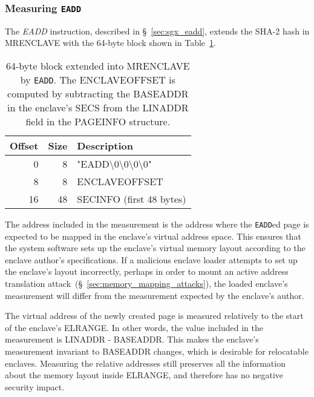\subsubsection{Measuring \texttt{EADD}}
\label{sec:sgx_eadd_mrenclave}


The \textit{EADD} instruction, described in \S~\ref{sec:sgx_eadd}, extends the
SHA-2 hash in MRENCLAVE with the 64-byte block shown in
Table~\ref{fig:eadd_mrenclave}.

\begin{table}[hbt]
  \centering
  \begin{tabularx}{\columnwidth}{| r | r | X |}
  \hline
  \textbf{Offset} & \textbf{Size} & \textbf{Description}\\
  \hline
  0 & 8 &
  "EADD\textbackslash{}0\textbackslash{}0\textbackslash{}0\textbackslash{}0" \\
  \hline
  8 & 8 & ENCLAVEOFFSET \\
  \hline
  16 & 48 & SECINFO (first 48 bytes) \\
  \hline
  \end{tabularx}
  \caption{
    64-byte block extended into MRENCLAVE by \texttt{EADD}. The ENCLAVEOFFSET
    is computed by subtracting the BASEADDR in the enclave's SECS from the
    LINADDR field in the PAGEINFO structure.
  }
  \label{fig:eadd_mrenclave}
\end{table}

The address included in the measurement is the address where the
\texttt{EADD}ed page is expected to be mapped in the enclave's virtual address
space. This ensures that the system software sets up the enclave's virtual
memory layout according to the enclave author's specifications. If a malicious
enclave loader attempts to set up the enclave's layout incorrectly, perhaps in
order to mount an active address translation
attack~(\S~\ref{sec:memory_mapping_attacks}), the loaded enclave's measurement
will differ from the measurement expected by the enclave's author.

The virtual address of the newly created page is measured relatively to the
start of the enclave's ELRANGE. In other words, the value included in the
measurement is LINADDR - BASEADDR. This makes the enclave's measurement
invariant to BASEADDR changes, which is desirable for relocatable enclaves.
Measuring the relative addresses still preserves all the information about the
memory layout inside ELRANGE, and therefore has no negative security impact.

